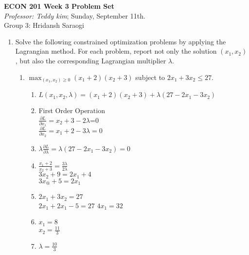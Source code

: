 \documentclass[11pt]{article}
\begin{document}
\begin{center}
\textbf{ECON 201 Week 3 Problem Set}\\
\textit {Professor: Teddy kim};  
Sunday, September 11th.
\\Group 3: Hridansh Saraogi
\end{center}

\begin{enumerate}
\item Solve the following constrained optimization problems by applying the Lagrangian method. For each problem, report not only the solution $(x_{1},x_{2})$, but also the corresponding Lagrangian multiplier $\lambda$.
    \begin{enumerate}
        \item $\max_{(x_{1},x_{2})\geq 0}(x_{1}+2)(x_{2}+3)$ subject to $2x_{1}+3x_{2}\leq 27$.
        \begin{enumerate}
                \item $L(x_1, x_2, \lambda) = (x_1 + 2) (x_2 + 3) + \lambda(27 - 2x_1 - 3x_2)$
                \item First Order Operation\\
                $\frac{\partial L}{\partial x_1} = x_2 + 3 -2\lambda$=0\\
                $\frac{\partial L}{\partial x_2} = x_1 + 2 -3\lambda=0$
                \item $\lambda \frac{\partial L}{\partial \lambda} = \lambda (27 -2x_1 -3x_2) = 0$
                \item $\frac{x_1 + 2}{x_2 + 3} = \frac{3\lambda}{2\lambda}$\\
                $3x_2 + 9 = 2x_1 + 4$\\
                $3x_@ + 5 = 2x_1$\\
                \item $2x_1 +3x_2 = 27$\\
                $2x_1 +2x_1 - 5 = 27$
                $4x_1 = 32$
                \item $x_1 = 8$\\
                $x_2 = \frac{11}{3}$
                \item $\lambda = \frac{10}{3}$
        \end{enumerate}


\end{enumerate}
\end{enumerate}
\end{document}
